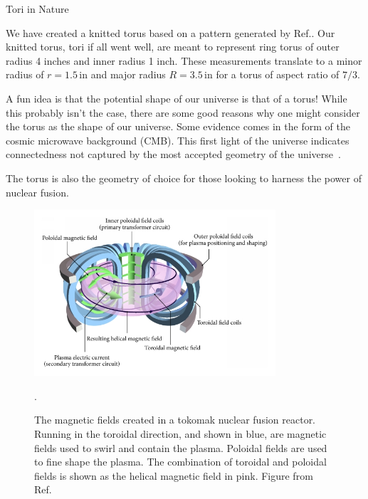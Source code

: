 \documentclass{beamer}
\newlength{\colwidth}
\begin{document}
\begin{frame}[t]
\begin{columns}[t]
\begin{column}{\colwidth}
\begin{block}{Tori in Nature}

We have created a knitted torus based on a pattern generated by Ref.\autocite{szczepanski_knitted_nodate}. Our knitted torus, tori if all went well, are meant to represent ring torus of outer radius 4 inches and inner radius 1 inch. These measurements translate to a minor radius of \(r=1.5\,\text{in}\) and major radius \(R=3.5\,\text{in}\) for a torus of aspect ratio of \(7/3\). 

A fun idea is that the potential shape of our universe is that of a torus! While this probably isn't the case, there are some good reasons why one might consider the torus as the shape of our universe. Some evidence comes in the form of the cosmic microwave background (CMB). This first light of the universe indicates connectedness not captured by the most accepted geometry of the universe~\autocite{aurich_variance_2021}.


The torus is also the geometry of choice for those looking to harness the power of nuclear fusion.

\begin{figure}
    \centering
    \includegraphics[width=0.8\textwidth]{figures/tokomak.jpg}
    \caption{The magnetic fields created in a tokomak nuclear fusion reactor. Running in the toroidal direction, and shown in blue, are magnetic fields used to swirl and contain the plasma. Poloidal fields are used to fine shape the plasma. The combination of toroidal and poloidal fields is shown as the helical magnetic field in pink. Figure from Ref.~\autocite{li_optimal_2014}}.
    \label{fig:tokomak}
\end{figure}


\end{block}
\end{column}
\end{columns}
\end{frame}
\end{document}
